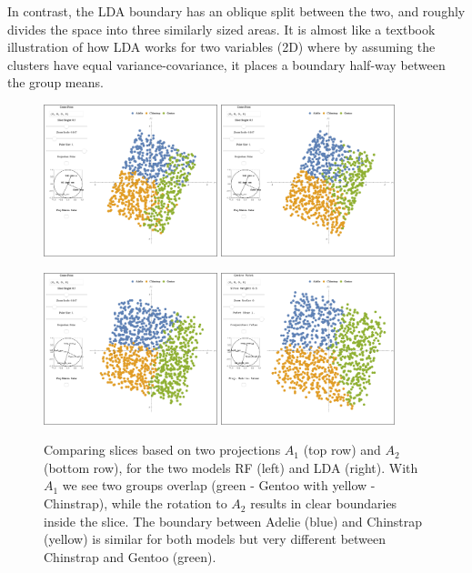 \documentclass[]{interact}
\theoremstyle{plain}%
\theoremstyle{definition}
\theoremstyle{remark}
\begin{document}
In contrast, the LDA boundary has an oblique split between the two, and
roughly divides the space into three similarly sized areas. It is almost
like a textbook illustration of how LDA works for two variables (2D)
where by assuming the clusters have equal variance-covariance, it places
a boundary half-way between the group means.

\begin{figure}[ht]
\centerline{\includegraphics[width=0.45\textwidth]{figures/slice1_rf.png}
\includegraphics[width=0.45\textwidth]{figures/slice1_lda.png}}
\centerline{\includegraphics[width=0.45\textwidth]{figures/slice2_rf.png}
\includegraphics[width=0.45\textwidth]{figures/slice2_lda.png}}
\caption{Comparing slices based on two projections $A_1$ (top row) and $A_2$ (bottom row), for the two models RF (left) and LDA (right). With $A_1$ we see two groups overlap (green - Gentoo with yellow - Chinstrap), while the rotation to $A_2$ results in clear boundaries inside the slice. The boundary between Adelie (blue) and Chinstrap (yellow) is similar for both models but very different between Chinstrap and Gentoo (green).}
\label{slice1}
\end{figure}
\end{document}
